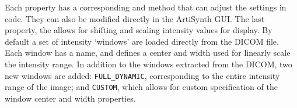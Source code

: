 
Each property has a corresponding  and  method that can
adjust the settings in code.  They can also be modified directly in the ArtiSynth GUI.  The
last property, the  allows for shifting and scaling intensity values for display.  
By default a set of intensity `windows' are loaded directly from the DICOM file.
Each window has a name, and defines a center and width used for linearly scale the intensity range.  
In addition to the windows extracted from the DICOM, two new windows are added: 
\texttt{FULL\_DYNAMIC}, corresponding to the entire intensity range of the image; and \texttt{CUSTOM},
which allows for custom specification of the window center and width properties.

